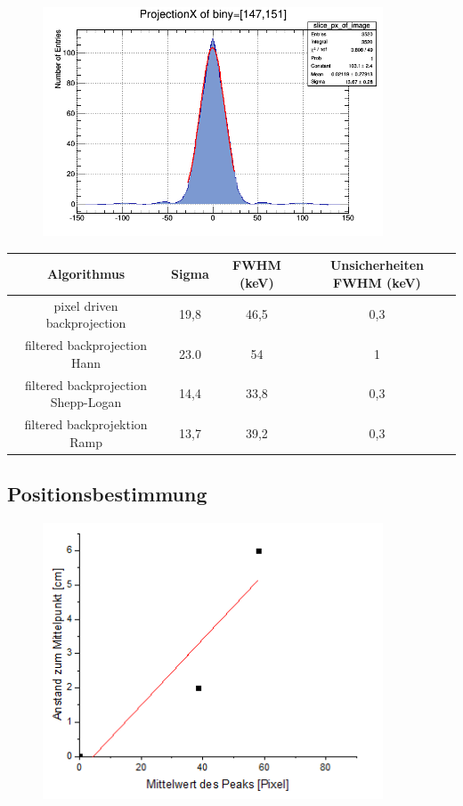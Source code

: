 \begin{figure}[h!]
	\centering
	\includegraphics[width=0.9\textwidth]{Ramp-Filter.png}
	\caption{}
	\label{}
\end{figure}


\begin{tabular}{|c|c|c|c|}
	\hline 
	Algorithmus & Sigma & FWHM (keV) & Unsicherheiten FWHM (keV) \\ 
	\hline 
	pixel driven backprojection & 19,8 & 46,5 & 0,3 \\ 
	\hline 
	filtered backprojection Hann & 23.0 & 54 & 1  \\ 
	\hline 
	filtered backprojection Shepp-Logan & 14,4 & 33,8 & 0,3 \\ 
	\hline 
	filtered backprojektion Ramp & 13,7 & 39,2 & 0,3 \\ 
	\hline 
\end{tabular} 

\subsection{Positionsbestimmung}
\begin{figure}[h!]
	\centering
	\includegraphics[width=0.9\textwidth]{Position.png}
	\caption{}
	\label{}
\end{figure}

